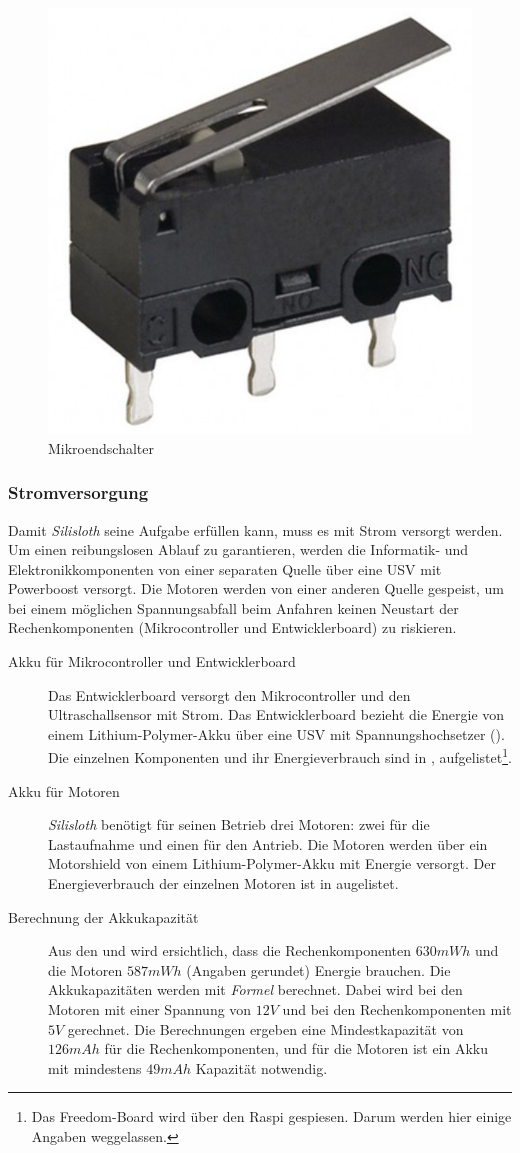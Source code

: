 \begin{figure}
    \centering
    \includegraphics[width=0.5\linewidth]{pics/drucktaster.jpg}
    \caption{Mikroendschalter}
    \label{fig:drucktaster}
\end{figure}

\subsubsection{Stromversorgung}

Damit \textit{Silisloth} seine Aufgabe erfüllen kann, muss es mit Strom versorgt werden. Um einen reibungslosen Ablauf zu garantieren, werden die Informatik- und Elektronikkomponenten von einer separaten Quelle über eine USV mit Powerboost versorgt. Die Motoren werden von einer anderen Quelle gespeist, um bei einem möglichen Spannungsabfall beim Anfahren keinen Neustart der Rechenkomponenten (Mikrocontroller und Entwicklerboard) zu riskieren.

\begin{description}
\item[Akku für Mikrocontroller und Entwicklerboard] Das Entwicklerboard versorgt den Mikrocontroller und den Ultraschallsensor mit Strom. Das Entwicklerboard bezieht die Energie von einem Lithium-Polymer-Akku über eine USV mit Spannungshochsetzer (). Die einzelnen Komponenten und ihr Energieverbrauch sind in , aufgelistet\footnote{Das Freedom-Board wird über den Raspi gespiesen. Darum werden hier einige Angaben weggelassen.}.
\item[Akku für Motoren] \textit{Silisloth} benötigt für seinen Betrieb drei Motoren: zwei für die Lastaufnahme und einen für den Antrieb. Die Motoren werden über ein Motorshield von einem Lithium-Polymer-Akku mit Energie versorgt. Der Energieverbrauch der einzelnen Motoren ist in  augelistet.
\item[Berechnung der Akkukapazität] Aus den  und  wird ersichtlich, dass die Rechenkomponenten $630mWh$ und die Motoren $587mWh$ (Angaben gerundet) Energie brauchen. Die Akkukapazitäten werden mit \textit{Formel}  berechnet. Dabei wird bei den Motoren mit einer Spannung von $12V$ und bei den Rechenkomponenten mit $5V$ gerechnet. Die Berechnungen ergeben eine Mindestkapazität von $126mAh$ für die Rechenkomponenten, und für die Motoren ist ein Akku mit mindestens $49mAh$ Kapazität notwendig.
\end{description}

